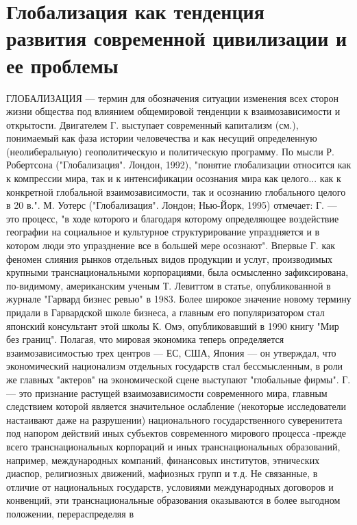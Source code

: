 \documentclass[12pt]{article}
\begin{document}
\section{Глобализация как тенденция развития современной цивилизации и ее проблемы}
ГЛОБАЛИЗАЦИЯ --- термин для обозначения ситуации изменения всех сторон жизни общества под влиянием
общемировой  тенденции  к  взаимозависимости  и  открытости.  Двигателем  Г.  выступает  современный
капитализм (см.), понимаемый как фаза истории человечества и как несущий определенную (неолиберальную)
геополитическую  и  политическую  программу.  По  мысли  Р.  Робертсона  ("Глобализация".  Лондон,  1992),
"понятие глобализации относится как к компрессии мира, так и к интенсификации осознания мира как целого...
как к конкретной глобальной взаимозависимости, так и осознанию глобального целого в 20 в.". М. Уотерс
("Глобализация". Лондон; Нью-Йорк, 1995) отмечает: Г. --- это процесс, "в ходе которого и благодаря которому
определяющее воздействие географии на социальное и культурное структурирование упраздняется и в котором
люди это упразднение все в большей мере осознают".
Впервые  Г.  как  феномен  слияния  рынков  отдельных  видов  продукции  и  услуг,  производимых  крупными
транснациональными корпорациями, была осмысленно зафиксирована, по-видимому, американским ученым Т.
Левиттом в статье, опубликованной в журнале "Гарвард бизнес ревью" в 1983. Более широкое значение новому
термину придали в Гарвардской школе бизнеса, а главным его популяризатором стал японский консультант этой
школы К. Омэ, опубликовавший  в  1990 книгу "Мир без границ".  Полагая,  что  мировая экономика теперь
определяется  взаимозависимостью  трех  центров  ---  ЕС,  США,  Япония  ---  он  утверждал,  что  экономический
национализм отдельных государств стал бессмысленным, в роли же главных "актеров" на экономической сцене
выступают "глобальные фирмы".
Г. --- это признание растущей взаимозависимости современного мира, главным следствием которой является
значительное  ослабление  (некоторые  исследователи  настаивают  даже  на  разрушении)  национального
государственного  суверенитета  под  напором  действий  иных  субъектов  современного  мирового  процесса  -прежде  всего  транснациональных  корпораций  и  иных  транснациональных  образований,  например,
международных компаний, финансовых институтов, этнических диаспор, религиозных движений, мафиозных
групп и т.д. Не связанные, в отличие от национальных государств, условиями международных договоров и
конвенций, эти транснациональные образования оказываются в более выгодном положении, перераспределяя в
\end{document}
